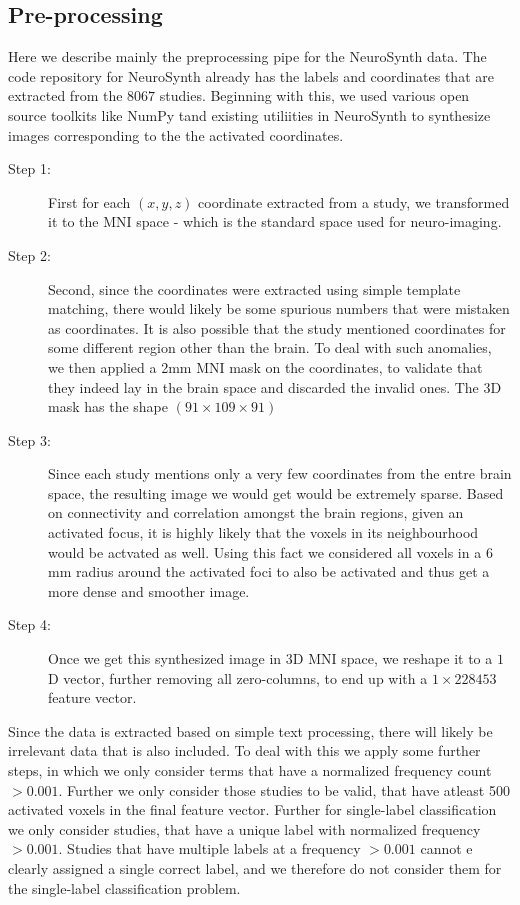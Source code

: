 \documentclass{article} %
\begin{document}
\subsection{Pre-processing}
\label{sec:preprocess}
Here we describe mainly the preprocessing pipe for the NeuroSynth data. The code repository for NeuroSynth already has the labels and coordinates that are extracted from the $8067$ studies. Beginning with this, we used various open source toolkits like NumPy tand existing utiliities in NeuroSynth to synthesize images corresponding to the the activated coordinates. 

\begin{description}
\item[Step 1: ] First for each $(x, y, z)$ coordinate extracted from a study, we transformed it to the MNI space - which is the standard space used for neuro-imaging. 
\item[Step 2: ] Second, since the coordinates were extracted using simple template matching, there would likely be some spurious numbers that were mistaken as coordinates. It is also possible that the study mentioned coordinates for some different region other than the brain. To deal with such anomalies, we then applied a 2mm MNI mask on the coordinates, to validate that they indeed lay in the brain space and discarded the invalid ones. The 3D mask has the shape $(91 \times 109 \times 91)$ 
\item[Step 3: ] Since each study mentions only a very few coordinates from the entre brain space, the resulting image we would get would be extremely sparse. Based on connectivity and correlation amongst the brain regions, given an activated focus, it is highly likely that the voxels in its neighbourhood would be actvated as well. Using this fact we considered all voxels in a $6$ mm radius around the activated foci to also be activated and thus get a more dense and smoother image.
\item[Step 4: ] Once we get this synthesized image in $3$D MNI space, we reshape it to a $1$D vector, further removing all zero-columns, to end up with a $1 \times 228453$ feature vector.  
\end{description}

Since the data is extracted based on simple text processing, there will likely be irrelevant data that is also included. To deal with this we apply some further steps, in which we only consider terms that have a normalized frequency count $ > 0.001$. Further we only consider those studies to be valid, that have atleast 500 activated voxels in the final feature vector. Further for single-label classification we only consider studies, that have a unique label with normalized frequency  $ > 0.001$. Studies that have multiple labels at a frequency $ > 0.001$ cannot e clearly assigned a single correct label, and we therefore do not consider them for the single-label classification problem.
\end{document}
